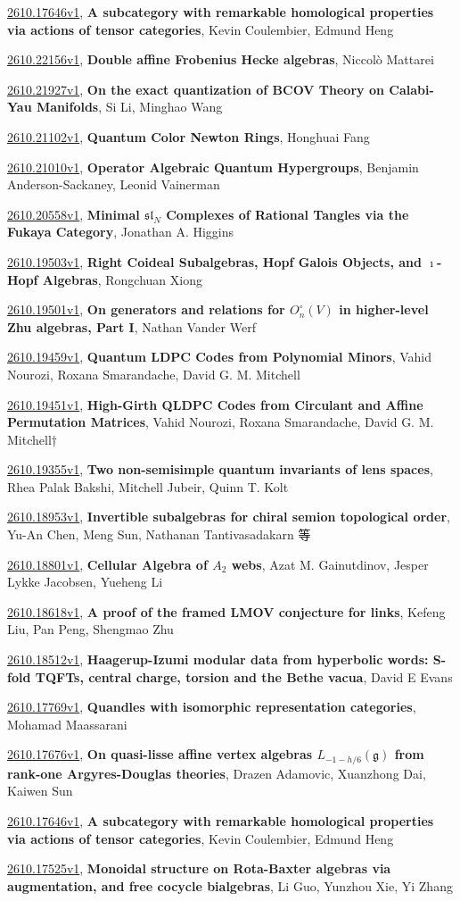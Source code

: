\documentclass[9pt, a4paper]{article}
\theoremstyle{plain}
\theoremstyle{definition}
\theoremstyle{remark}
\newcommand{\arxiv}[3]{\href{https://arxiv.org/abs/#1}{#1}, \textbf{\textcolor{arxivblue}{#2}}, #3}
\begin{document}
\arxiv{2610.17646v1}{A subcategory with remarkable homological properties via actions of tensor categories}{Kevin Coulembier, Edmund Heng}

\arxiv{2610.22156v1}{Double affine Frobenius Hecke algebras}{Niccolò Mattarei}

\arxiv{2610.21927v1}{On the exact quantization of BCOV Theory on Calabi-Yau Manifolds}{Si Li, Minghao Wang}

\arxiv{2610.21102v1}{Quantum Color Newton Rings}{Honghuai Fang}

\arxiv{2610.21010v1}{Operator Algebraic Quantum Hypergroups}{Benjamin Anderson-Sackaney, Leonid Vainerman}

\arxiv{2610.20558v1}{Minimal $\mathfrak{sl}_N$ Complexes of Rational Tangles via the Fukaya Category}{Jonathan A. Higgins}

\arxiv{2610.19503v1}{Right Coideal Subalgebras, Hopf Galois Objects, and $\imath$-Hopf Algebras}{Rongchuan Xiong}

\arxiv{2610.19501v1}{On generators and relations for $O_n^\circ(V)$ in higher-level Zhu algebras, Part I}{Nathan Vander Werf}

\arxiv{2610.19459v1}{Quantum LDPC Codes from Polynomial Minors}{Vahid Nourozi, Roxana Smarandache, David G. M. Mitchell}

\arxiv{2610.19451v1}{High-Girth QLDPC Codes from Circulant and Affine Permutation Matrices}{Vahid Nourozi, Roxana Smarandache, David G. M. Mitchell†}

\arxiv{2610.19355v1}{Two non-semisimple quantum invariants of lens spaces}{Rhea Palak Bakshi, Mitchell Jubeir, Quinn T. Kolt}

\arxiv{2610.18953v1}{Invertible subalgebras for chiral semion topological order}{Yu-An Chen, Meng Sun, Nathanan Tantivasadakarn 等}

\arxiv{2610.18801v1}{Cellular Algebra of $A_2$ webs}{Azat M. Gainutdinov, Jesper Lykke Jacobsen, Yueheng Li}

\arxiv{2610.18618v1}{A proof of the framed LMOV conjecture for links}{Kefeng Liu, Pan Peng, Shengmao Zhu}

\arxiv{2610.18512v1}{Haagerup-Izumi modular data from hyperbolic words: S-fold TQFTs, central charge, torsion and the Bethe vacua}{David E Evans}

\arxiv{2610.17769v1}{Quandles with isomorphic representation categories}{Mohamad Maassarani}

\arxiv{2610.17676v1}{On quasi-lisse affine vertex algebras $L_{-1-h/6}(\mathfrak{g})$ from rank-one Argyres-Douglas theories}{Drazen Adamovic, Xuanzhong Dai, Kaiwen Sun}

\arxiv{2610.17646v1}{A subcategory with remarkable homological properties via actions of tensor categories}{Kevin Coulembier, Edmund Heng}

\arxiv{2610.17525v1}{Monoidal structure on Rota-Baxter algebras via augmentation, and free cocycle bialgebras}{Li Guo, Yunzhou Xie, Yi Zhang}

\end{document}
